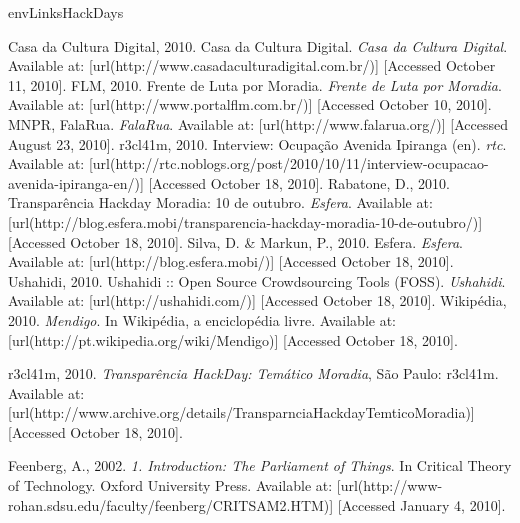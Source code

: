 \startenvironment envLinksHackDays

\myLinks%
{%
\startREF%
Casa da Cultura Digital, 2010. Casa da Cultura Digital. {\em Casa da Cultura Digital}. Available at:  [url(http://www.casadaculturadigital.com.br/)] [Accessed October 11, 2010].%
\nl%
FLM, 2010. Frente de Luta por Moradia. {\em Frente de Luta por Moradia}. Available at:  [url(http://www.portalflm.com.br/)] [Accessed October 10, 2010].%
\nl%
MNPR, FalaRua. {\em FalaRua}. Available at:  [url(http://www.falarua.org/)] [Accessed August 23, 2010].%
\nl%
r3cl41m, 2010. Interview: Ocupação Avenida Ipiranga (en). {\em rtc}. Available at:  [url(http://rtc.noblogs.org/post/2010/10/11/interview-ocupacao-avenida-ipiranga-en/)] [Accessed October 18, 2010].%
\nl%
Rabatone, D., 2010. Transparência Hackday Moradia: 10 de outubro. {\em Esfera}. Available at:  [url(http://blog.esfera.mobi/transparencia-hackday-moradia-10-de-outubro/)] [Accessed October 18, 2010].%
\nl%
Silva, D. \& Markun, P., 2010. Esfera. {\em Esfera}. Available at:  [url(http://blog.esfera.mobi/)] [Accessed October 18, 2010].%
\nl%
Ushahidi, 2010. Ushahidi :: Open Source Crowdsourcing Tools (FOSS). {\em Ushahidi}. Available at:  [url(http://ushahidi.com/)] [Accessed October 18, 2010].%
\nl%
Wikipédia, 2010. {\em Mendigo}. In Wikipédia, a enciclopédia livre. Available at:  [url(http://pt.wikipedia.org/wiki/Mendigo)] [Accessed October 18, 2010].%
\stopREF%
}

\myMedia%
{%
\startREF%
r3cl41m, 2010. {\em Transparência HackDay: Temático Moradia}, São Paulo: r3cl41m. Available at:  [url(http://www.archive.org/details/TransparnciaHackdayTemticoMoradia)] [Accessed October 18, 2010].%
\stopREF%
}

\myRefs%
{%
\startREF%
Feenberg, A., 2002. {\em 1. Introduction: The Parliament of Things}. In Critical Theory of Technology.  Oxford University Press. Available at:  [url(http://www-rohan.sdsu.edu/faculty/feenberg/CRITSAM2.HTM)] [Accessed January 4, 2010].%
\stopREF%
}

\stopenvironment